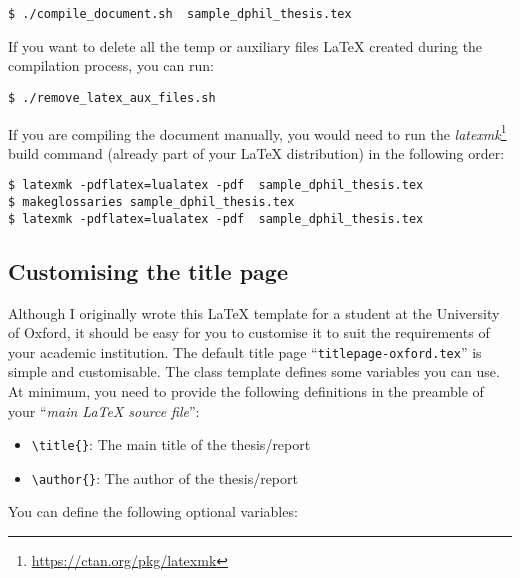 \begin{lstlisting}[style=custom-bash]
$ ./compile_document.sh  sample_dphil_thesis.tex
\end{lstlisting}


If you want to delete all the temp or auxiliary files LaTeX created during the compilation process, you can run:


\begin{lstlisting}[style=custom-bash]
$ ./remove_latex_aux_files.sh
\end{lstlisting}


If you are compiling the document manually, you would need to run the \textit{latexmk}\footnote{\url{https://ctan.org/pkg/latexmk}} build command (already part of your LaTeX distribution) in the following order:


\begin{lstlisting}[style=custom-bash]
$ latexmk -pdflatex=lualatex -pdf  sample_dphil_thesis.tex
$ makeglossaries sample_dphil_thesis.tex
$ latexmk -pdflatex=lualatex -pdf  sample_dphil_thesis.tex
\end{lstlisting}


\subsection{Customising the title page}


Although I originally wrote this LaTeX template for a student at the University of Oxford, it should be easy for you to customise it to suit the requirements of your academic institution. The default title page ``\verb|titlepage-oxford.tex|'' is simple and customisable. The class template defines some variables you can use. At minimum, you need to provide the following definitions in the preamble of your ``\textit{main LaTeX source file}'':


\begin{itemize}

    \item \verb|\title{}|: The main title of the thesis/report
    \item \verb|\author{}|: The author of the thesis/report

\end{itemize}

You can define the following optional variables:

